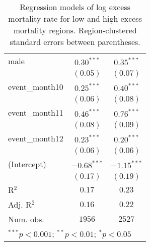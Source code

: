 \begin{table}
\begin{center}
\begin{tabular}{l c c}
male            & $0.30^{***}$  & $0.35^{***}$  \\
                & $(0.05)$      & $(0.07)$      \\
event\_month10  & $0.25^{***}$  & $0.40^{***}$  \\
                & $(0.06)$      & $(0.08)$      \\
event\_month11  & $0.46^{***}$  & $0.76^{***}$  \\
                & $(0.08)$      & $(0.09)$      \\
event\_month12  & $0.23^{***}$  & $0.20^{***}$  \\
                & $(0.06)$      & $(0.06)$      \\
(Intercept)     & $-0.68^{***}$ & $-1.15^{***}$ \\
                & $(0.17)$      & $(0.19)$      \\
\hline
R$^2$           & $0.17$        & $0.23$        \\
Adj. R$^2$      & $0.16$        & $0.22$        \\
Num. obs.       & $1956$        & $2527$        \\
\hline
\multicolumn{3}{l}{\scriptsize{$^{***}p<0.001$; $^{**}p<0.01$; $^{*}p<0.05$}}
\end{tabular}
\caption{Regression models of log excess mortality rate for low and high excess mortality regions. Region-clustered standard errors between parentheses.}
\label{tab:hilomodels}
\end{center}
\end{table}
